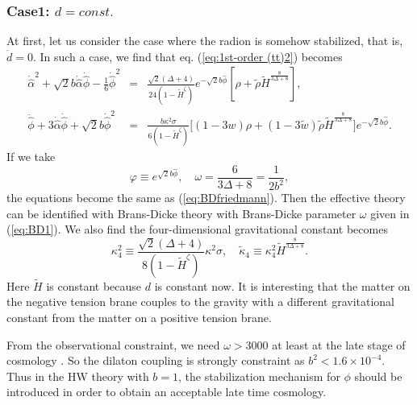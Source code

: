 \documentclass[a4paper,11pt]{article}
\begin{document}
\subsubsection{Case1: $d = const.$}
At first, let us consider the case where the radion is somehow 
stabilized, that is, $\dot{d}=0$. In such a case, we find that eq.
(\ref{eq:1st-order (tt)2}) becomes
\begin{eqnarray}
\dot{\hat{\alpha}}^2+\sqrt{2}b\dot{\hat{\alpha}}\dot{\hat{\phi}}
-\frac{1}{6}\dot{\hat{\phi}}^2  
&=& \frac{\sqrt{2}(\Delta +4)}{24(1-\tilde{H}^{\zeta})}
e^{-\sqrt{2}b\hat{\phi}}
\left[
\rho + \tilde{\rho}\tilde{H}^{\frac{8}{3\Delta +8}}
\right], \\
\ddot{\hat{\phi}}+3\dot{\hat{\alpha}}\dot{\hat{\phi}}
+\sqrt{2}b\dot{\hat{\phi}}^2  
&=& \frac{b\kappa^2 \sigma}{6(1-\tilde{H}^{\zeta})} 
\Big[
(1-3w)\rho
+ (1-3\tilde{w})\tilde{\rho} \tilde{H}^{\frac{8}{3\Delta +8}}
\Big]e^{-\sqrt{2}b\hat{\phi}}. 
\label{eq:F1}
\end{eqnarray}
If we take
\begin{equation}
\varphi \equiv e^{\sqrt{2}b\hat{\phi}}, \quad 
\omega = \frac{6}{3\Delta +8}= \frac{1}{2b^2} , 
\label{eq:BD1}
\end{equation}
the equations become the same as (\ref{eq:BDfriedmann}).
Then the effective theory can be identified with Brans-Dicke theory with 
Brans-Dicke parameter $\omega$ given in  (\ref{eq:BD1}). 
We also find the four-dimensional gravitational constant becomes
\begin{equation}
\kappa_4^2 \equiv \frac{\sqrt{2}(\Delta +4)}{8(1-\tilde{H}^{\zeta})}
\kappa^2 \sigma, \quad 
\tilde{\kappa}_4 \equiv 
\kappa_4^2 \tilde{H}^{\frac{8}{3 \Delta+8}}.
\end{equation}
Here $\tilde{H}$ is constant because $d$ is constant now. 
It is interesting that the matter on the negative tension brane
couples to the gravity with a different gravitational constant
from the matter on a positive tension brane.

From the observational constraint, we need $\omega > 3000$ 
at least at the late stage of cosmology \cite{Will}. So the dilaton
coupling is strongly constraint as $b^2 < 1.6 \times 10^{-4}$. 
Thus in the HW theory with $b=1$, the stabilization mechanism for 
$\phi$ should be introduced in order to obtain an acceptable
late time cosmology.
 
\end{document}
